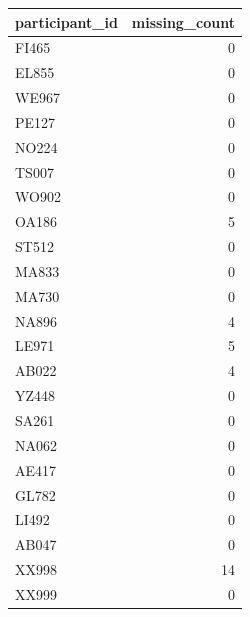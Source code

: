 \begin{tabular}{lr}
\toprule
participant_id & missing_count \\
\midrule
FI465 & 0 \\
EL855 & 0 \\
WE967 & 0 \\
PE127 & 0 \\
NO224 & 0 \\
TS007 & 0 \\
WO902 & 0 \\
OA186 & 5 \\
ST512 & 0 \\
MA833 & 0 \\
MA730 & 0 \\
NA896 & 4 \\
LE971 & 5 \\
AB022 & 4 \\
YZ448 & 0 \\
SA261 & 0 \\
NA062 & 0 \\
AE417 & 0 \\
GL782 & 0 \\
LI492 & 0 \\
AB047 & 0 \\
XX998 & 14 \\
XX999 & 0 \\
\bottomrule
\end{tabular}
